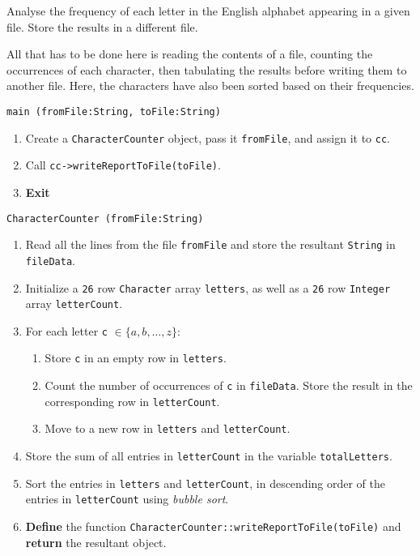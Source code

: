 

\problem Analyse the frequency of each letter in the English alphabet appearing in a given file. Store the results
in a different file.

\solution
All that has to be done here is reading the contents of a file, counting the occurrences of each character, then tabulating
the results before writing them to another file. Here, the characters have also been sorted based on their frequencies.

\algorithm
\texttt{main (fromFile:String, toFile:String)}
\begin{enumerate}
	\item Create a \texttt{CharacterCounter} object, pass it \texttt{fromFile}, and assign it to \texttt{cc}.
	\item Call \texttt{cc->writeReportToFile(toFile)}.
	\item \textbf{Exit} 
\end{enumerate}
\vspace{8mm}
\texttt{CharacterCounter (fromFile:String)}
\begin{enumerate}
	\item Read all the lines from the file \texttt{fromFile} and store the resultant \texttt{String} in \texttt{fileData}.
	\item Initialize a \texttt{26} row \texttt{Character} array \texttt{letters}, as well as a \texttt{26} row
		\texttt{Integer} array \texttt{letterCount}.
	\item For each letter \texttt{c} $\in \{a, b, \dots, z\}$:
	\begin{enumerate}
		\item Store \texttt{c} in an empty row in \texttt{letters}. 
		\item Count the number of occurrences of \texttt{c} in \texttt{fileData}. Store the result in the corresponding
			row in \texttt{letterCount}.
		\item Move to a new row in \texttt{letters} and  \texttt{letterCount}.
	\end{enumerate}
	\item Store the sum of all entries in \texttt{letterCount} in the variable \texttt{totalLetters}.
	\item Sort the entries in \texttt{letters} and \texttt{letterCount}, in descending order of the entries in \texttt{letterCount}
		using \textit{bubble sort}.
	\item \textbf{Define} the function \texttt{CharacterCounter::writeReportToFile(toFile)} and \textbf{return} the resultant object.
\end{enumerate}
